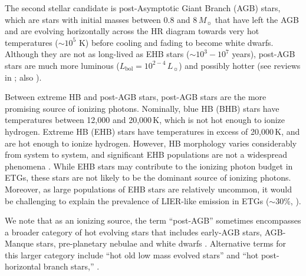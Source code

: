 \documentclass[preprint2]{aastex62}
\newcommand\Lsun{\ensuremath{\,L_{\sun}}\xspace}
\newcommand\Msun{\ensuremath{\,M_{\sun}}\xspace}
\begin{document}
The second stellar candidate is post-Asymptotic Giant Branch (AGB) stars, which are stars with initial masses between 0.8 and 8\Msun that have left the AGB and are evolving horizontally across the HR diagram towards very hot temperatures ($\sim10^5$ K) before cooling and fading to become white dwarfs. Although they are not as long-lived as EHB stars ($\sim10^3-10^7$ years), post-AGB stars are much more luminous ($L_{\mathrm{bol}} = 10^{2-4}\Lsun$) and possibly hotter (see reviews in \citealp{OConnell+1999, Grevesse+2010}; also \citealp{Bressan+2012}). 

Between extreme HB and post-AGB stars, post-AGB stars are the more promising source of ionizing photons. Nominally, blue HB (BHB) stars have temperatures between 12,000 and 20,000\,K, which is not hot enough to ionize hydrogen. Extreme HB (EHB) stars have temperatures in excess of 20,000\,K, and are hot enough to ionize hydrogen. However, HB morphology varies considerably from system to system, and significant EHB populations are not a widespread phenomena \citep[see recent review in][]{Catelan+2009}. While EHB stars may contribute to the ionizing photon budget in ETGs, these stars are not likely to be the dominant source of ionizing photons. Moreover, as large populations of EHB stars are relatively uncommon, it would be challenging to explain the prevalence of LIER-like emission in ETGs ($\sim30$\%, \citealt{Yan+2018}).

We note that as an ionizing source, the term ``post-AGB'' sometimes encompasses a broader category of hot evolving stars that includes early-AGB stars, AGB-Manque stars, pre-planetary nebulae and white dwarfs \citep{Stasinska+2008}. Alternative terms for this larger category include ``hot old low mass evolved stars'' \citep[HOLMES; ][]{CidFernandes+2011} and ``hot post-horizontal branch stars,'' \citep[HPHB; ][]{Rosenfield+2012}.
\end{document}
